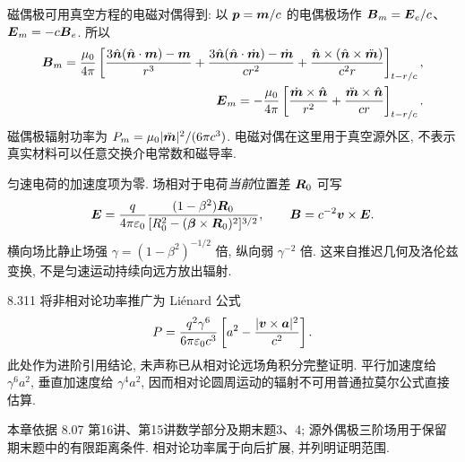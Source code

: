 磁偶极可用真空方程的电磁对偶得到: 以 $\boldsymbol{p}=\boldsymbol{m}/c$ 的电偶极场作 $\boldsymbol{B}_m=\boldsymbol{E}_e/c$、$\boldsymbol{E}_m=-c\boldsymbol{B}_e$. 所以
\begin{align*}
\boldsymbol{B}_m={\mu_0\over4\pi}\left[
\frac{3\hat{\boldsymbol{n}}(\hat{\boldsymbol{n}}\cdot\boldsymbol{m})-\boldsymbol{m}}{r^3}
+\frac{3\hat{\boldsymbol{n}}(\hat{\boldsymbol{n}}\cdot\dot{\boldsymbol{m}})-\dot{\boldsymbol{m}}}{cr^2}
+\frac{\hat{\boldsymbol{n}}\times(\hat{\boldsymbol{n}}\times\ddot{\boldsymbol{m}})}{c^2r}\right]_{t-r/c},\\
\boldsymbol{E}_m=-{\mu_0\over4\pi}\left[\frac{\dot{\boldsymbol{m}}\times\hat{\boldsymbol{n}}}{r^2}
+\frac{\ddot{\boldsymbol{m}}\times\hat{\boldsymbol{n}}}{cr}\right]_{t-r/c}.
\end{align*}
磁偶极辐射功率为 $P_m=\mu_0|\ddot{\boldsymbol{m}}|^2/(6\pi c^3)$. 电磁对偶在这里用于真空源外区, 不表示真实材料可以任意交换介电常数和磁导率.

匀速电荷的加速度项为零. 场相对于电荷\emph{当前}位置差 $\boldsymbol{R}_0$ 可写
\[
\boldsymbol{E}=\frac q{4\pi\varepsilon_0}\frac{(1-\beta^2)\boldsymbol{R}_0}
{[R_0^2-(\boldsymbol{\beta}\times\boldsymbol{R}_0)^2]^{3/2}},\qquad
\boldsymbol{B}=c^{-2}\boldsymbol{v}\times\boldsymbol{E}.
\]
横向场比静止场强 $\gamma=(1-\beta^2)^{-1/2}$ 倍, 纵向弱 $\gamma^{-2}$ 倍. 这来自推迟几何及洛伦兹变换, 不是匀速运动持续向远方放出辐射.

8.311 将非相对论功率推广为 Li\'enard 公式
\[
P=\frac{q^2\gamma^6}{6\pi\varepsilon_0 c^3}
\left[a^2-\frac{|\boldsymbol{v}\times\boldsymbol{a}|^2}{c^2}\right].
\]
此处作为进阶引用结论, 未声称已从相对论远场角积分完整证明. 平行加速度给 $\gamma^6a^2$, 垂直加速度给 $\gamma^4a^2$, 因而相对论圆周运动的辐射不可用普通拉莫尔公式直接估算.




本章依据 8.07 第16讲、第15讲数学部分及期末题3、4; 源外偶极三阶场用于保留期末题中的有限距离条件. 相对论功率属于向后扩展, 并列明证明范围.
